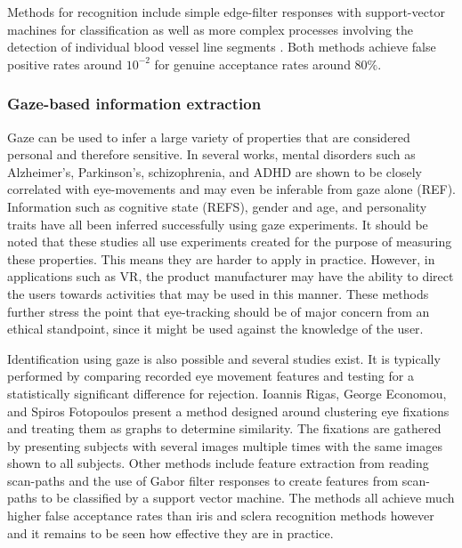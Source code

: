 Methods for recognition include simple edge-filter responses with support-vector machines for classification \cite{dasNewEfficientAdaptive2014} as well as more complex processes involving the detection of individual blood vessel line segments \cite{zhouNewHumanIdentification2012}. Both methods achieve false positive rates around $10^{-2}$ for genuine acceptance rates around $80\%$.


\subsubsection{Gaze-based information extraction}
Gaze can be used to infer a large variety of properties that are considered personal and therefore sensitive. In several works, mental disorders such as Alzheimer's, Parkinson's, schizophrenia, and ADHD are shown to be closely correlated with eye-movements and may even be inferable from gaze alone (REF). Information such as cognitive state (REFS), gender and age, and personality traits have all been inferred successfully using gaze experiments. It should be noted that these studies all use experiments created for the purpose of measuring these properties. This means they are harder to apply in practice. However, in applications such as VR, the product manufacturer may have the ability to direct the users towards activities that may be used in this manner. These methods further stress the point that eye-tracking should be of major concern from an ethical standpoint, since it might be used against the knowledge of the user. 

Identification using gaze is also possible and several studies exist. It is typically performed by comparing recorded eye movement features and testing for a statistically significant difference for rejection. Ioannis Rigas, George Economou, and Spiros Fotopoulos \cite{rigasBiometricIdentificationBased2012} present a method designed around clustering eye fixations and treating them as graphs to determine similarity. The fixations are gathered by presenting subjects with several images multiple times with the same images shown to all subjects. Other methods include feature extraction from reading scan-paths \cite{hollandBiometricIdentificationEye2011, bednarikEyeMovementsBiometric2005} and the use of Gabor filter responses to create features from scan-paths to be classified by a support vector machine\cite{liBiometricRecognitionTexture2018}. The methods all achieve much higher false acceptance rates than iris and sclera recognition methods however and it remains to be seen how effective they are in practice.




